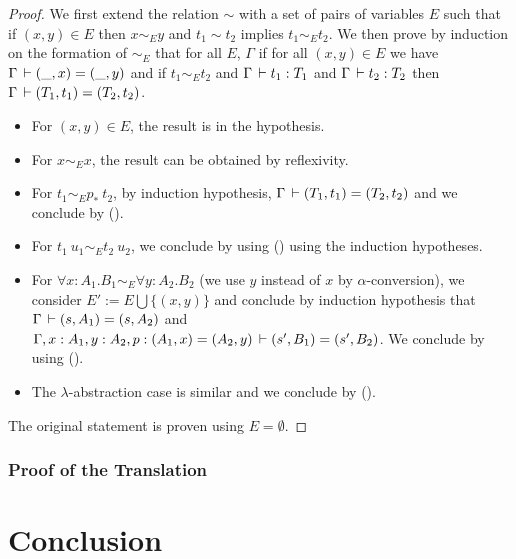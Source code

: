 \documentclass[11pt]{article}
\theoremstyle{plain}
\theoremstyle{remark}
\begin{document}
\begin{proof}
  We first extend the relation $\sim$ with a set of pairs of variables $E$
  such that if $(x,y) \in E$ then $x \sim_E y$ and $t_1 \sim t_2$ implies
  $t_1 \sim_E t_2$.
  We then prove by induction on the formation of $\sim_E$ that for all $E$,
  $\Gamma$ if for all $(x,y) \in E$ we have $\Gamma \,\vdash (\_,x) = (\_,y)$ and if
  $t_1 \sim_E t_2$ and $\Gamma \,\vdash t_1 : T_1$ and $\Gamma \,\vdash t_2 : T_2$
  then $\Gamma \,\vdash (T_1,t_1) = (T_2,t_2)$.
  \begin{itemize}
    \item For $(x,y) \in E$, the result is in the hypothesis.
    \item For $x \sim_E x$, the result can be obtained by reflexivity.
    \item For $t_1 \sim_E p_*\ t_2$, by induction hypothesis,
          $\Gamma \,\vdash (T_1,t_1) = (T_2,t_2)$ and we conclude by
          ().
    \item For $t_1\ u_1 \sim_E t_2\ u_2$, we conclude by using
          () using the induction hypotheses.
    \item For $\forall x:A_1.B_1 \sim_E \forall y:A_2.B_2$ (we use $y$ instead
          of $x$ by $\alpha$-conversion), we consider
          $E' := E \bigcup \{ (x,y) \}$ and conclude by induction hypothesis
          that $\Gamma \,\vdash (s,A_1) = (s,A_2)$ and
          $\Gamma, x:A_1, y:A_2, p : (A_1,x) = (A_2,y) \,\vdash
          (s',B_1) = (s',B_2)$.
          We conclude by using ().
    \item The $\lambda$-abstraction case is similar and we conclude by
          ().
  \end{itemize}
  The original statement is proven using $E = \emptyset$.
\end{proof}

\subsubsection{Proof of the Translation}

\section*{Conclusion}




\end{document}

